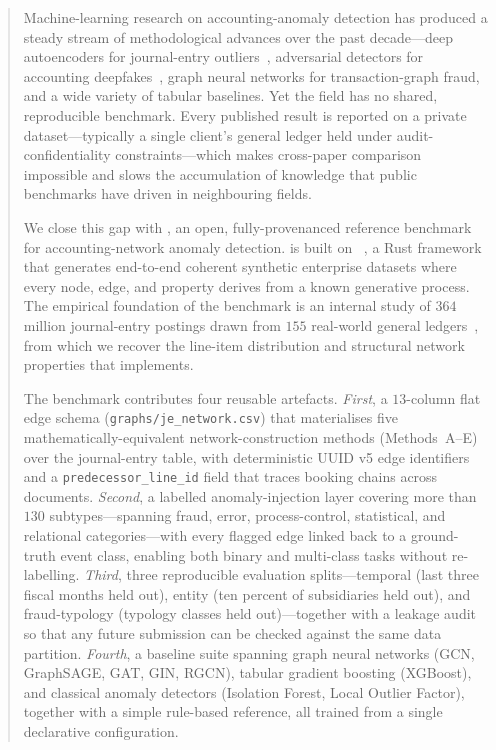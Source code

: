 \begin{abstract}
Machine-learning research on accounting-anomaly detection has produced
a steady stream of methodological advances over the past decade---deep
autoencoders for journal-entry outliers~\citep{schreyer2017detection},
adversarial detectors for accounting deepfakes~\citep{schreyer2019adversarial},
graph neural networks for transaction-graph fraud, and a wide variety of
tabular baselines.  Yet the field has no shared, reproducible benchmark.
Every published result is reported on a private dataset---typically a
single client's general ledger held under audit-confidentiality
constraints---which makes cross-paper comparison impossible and slows
the accumulation of knowledge that public benchmarks
\citep{deng2009imagenet,krizhevsky2009cifar,hu2020ogb} have driven in
neighbouring fields.

We close this gap with \bench{}, an open, fully-provenanced reference
benchmark for accounting-network anomaly detection.  \bench{} is built on
\system{}~\citep{ivertowski2026datasynth}, a Rust framework that
generates end-to-end coherent synthetic enterprise datasets where every
node, edge, and property derives from a known generative process.  The
empirical foundation of the benchmark is an internal study of $364$
million journal-entry postings drawn from $155$ real-world general
ledgers~\citep{ivertowski2024apn}, from which we recover the line-item
distribution and structural network properties that \system{}
implements.

The benchmark contributes four reusable artefacts.  \emph{First}, a
$13$-column flat edge schema (\texttt{graphs/je\_network.csv}) that
materialises five mathematically-equivalent network-construction
methods (Methods~A--E) over the journal-entry table, with
deterministic UUID v5 edge identifiers and a \texttt{predecessor\_line\_id}
field that traces booking chains across documents.
\emph{Second}, a labelled anomaly-injection layer covering more than
$130$ subtypes---spanning fraud, error, process-control, statistical,
and relational categories---with every flagged edge linked back to a
ground-truth event class, enabling both binary and multi-class tasks
without re-labelling.
\emph{Third}, three reproducible evaluation splits---temporal (last
three fiscal months held out), entity (ten percent of subsidiaries held
out), and fraud-typology (typology classes held out)---together with a
leakage audit so that any future submission can be checked against the
same data partition.
\emph{Fourth}, a baseline suite spanning graph neural networks (GCN,
GraphSAGE, GAT, GIN, RGCN), tabular gradient boosting (XGBoost), and
classical anomaly detectors (Isolation Forest, Local Outlier Factor),
together with a simple rule-based reference, all trained from a single
declarative configuration.


\end{abstract}
